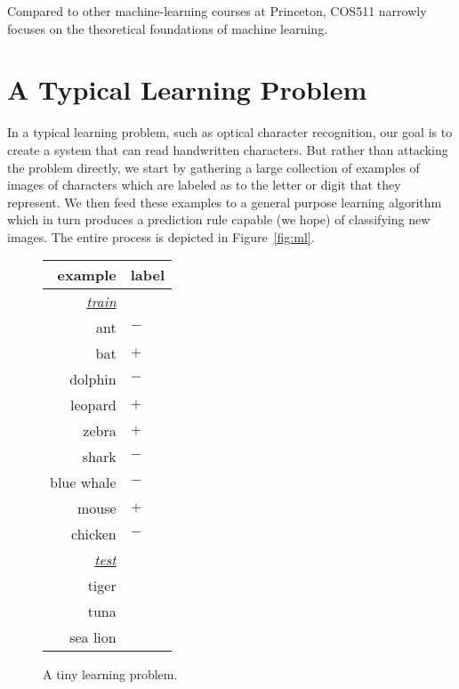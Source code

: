 \documentclass[11pt]{article}
\begin{document}
Compared to other machine-learning courses at Princeton,
COS511 narrowly focuses on the theoretical foundations of
machine learning.

\section{A Typical Learning Problem}

In a typical learning problem, such as optical character recognition,
our goal is to create a system that can read handwritten characters.
But rather than attacking the problem directly, we start by gathering
a large collection of examples of images of characters which are
labeled as to the letter or digit that they represent.
We then feed these examples to a general purpose learning algorithm
which in turn produces a prediction rule capable (we hope) of
classifying new images.
The entire process is depicted in Figure~\ref{fig:ml}.

\newcommand{\pls}{$+$}
\newcommand{\mns}{$-$}

\begin{figure}[t]

\begin{center}
\begin{tabular}{r|l}
{\bf example} & {\bf label} \\
\hline
\underline{\it train} & \\
ant & \mns \\
bat & \pls \\
dolphin & \mns \\
leopard & \pls \\
zebra & \pls \\
shark & \mns \\
blue whale & \mns \\
mouse & \pls \\
chicken & \mns \\
\hline
\underline{\it test} & \\
tiger &      \\
tuna  &      \\
sea lion &  \\
\end{tabular}
\end{center}

\caption{A tiny learning problem.}
\label{fig:prob1}
\end{figure}



\newcommand{\ra}{$\rightarrow$}
\end{document}
